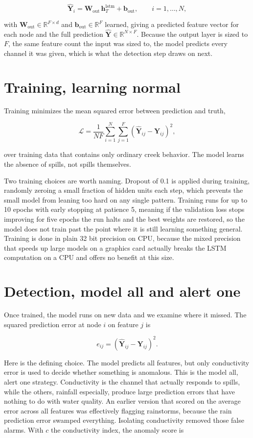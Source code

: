 \documentclass[11pt]{article}
\begin{document}
\[
\hat{\mathbf{Y}}_i = \mathbf{W}_{\text{out}} \, \mathbf{h}_T^{\text{lstm}} + \mathbf{b}_{\text{out}}, \qquad i = 1, \dots, N,
\]

with $\mathbf{W}_{\text{out}} \in \mathbb{R}^{F \times d}$ and $\mathbf{b}_{\text{out}} \in \mathbb{R}^{F}$ learned, giving a predicted feature vector for each node and the full prediction $\hat{\mathbf{Y}} \in \mathbb{R}^{N \times F}$. Because the output layer is sized to $F$, the same feature count the input was sized to, the model predicts every channel it was given, which is what the detection step draws on next.

\section*{Training, learning normal}

Training minimizes the mean squared error between prediction and truth,

\[
\mathcal{L} = \frac{1}{N F} \sum_{i=1}^{N} \sum_{j=1}^{F} \left( \hat{\mathbf{Y}}_{ij} - \mathbf{Y}_{ij} \right)^2,
\]

over training data that contains only ordinary creek behavior. The model learns the absence of spills, not spills themselves.

Two training choices are worth naming. Dropout of 0.1 is applied during training, randomly zeroing a small fraction of hidden units each step, which prevents the small model from leaning too hard on any single pattern. Training runs for up to 10 epochs with early stopping at patience 5, meaning if the validation loss stops improving for five epochs the run halts and the best weights are restored, so the model does not train past the point where it is still learning something general. Training is done in plain 32 bit precision on CPU, because the mixed precision that speeds up large models on a graphics card actually breaks the LSTM computation on a CPU and offers no benefit at this size.

\section*{Detection, model all and alert one}

Once trained, the model runs on new data and we examine where it missed. The squared prediction error at node $i$ on feature $j$ is

\[
e_{ij} = \left( \hat{\mathbf{Y}}_{ij} - \mathbf{Y}_{ij} \right)^2.
\]

Here is the defining choice. The model predicts all features, but only conductivity error is used to decide whether something is anomalous. This is the model all, alert one strategy. Conductivity is the channel that actually responds to spills, while the others, rainfall especially, produce large prediction errors that have nothing to do with water quality. An earlier version that scored on the average error across all features was effectively flagging rainstorms, because the rain prediction error swamped everything. Isolating conductivity removed those false alarms. With $c$ the conductivity index, the anomaly score is
\end{document}
